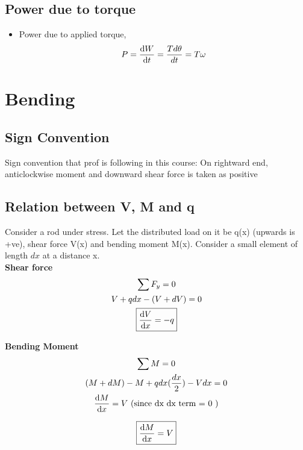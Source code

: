 \documentclass{article}
\begin{document}
	\subsection{Power due to torque}
	\begin{itemize}
		\item Power due to applied torque,
		\[P = \dv{W}{t} = \frac{Td\theta}{dt} = T\omega\]

	\end{itemize}


\section{Bending}

	\subsection{Sign Convention}
		Sign convention that prof is following in this course: On rightward end, anticlockwise moment and downward shear force is taken as positive


	\subsection{Relation between V, M and q}
		Consider a rod under stress. Let the distributed load on it be q(x) (upwards is +ve), shear force V(x) and bending moment M(x). Consider a small element of length $dx$ at a distance x. \\

		\noindent \textbf{Shear force}
		\begin{gather*}
			\sum F_y = 0\\
			V + q dx - (V+dV) =0 \\ %
			\boxed{\dv{V}{x} = - q}
		\end{gather*}

		\noindent \textbf{Bending Moment}
		\begin{gather*}
			\sum M = 0 \\
			(M + dM) - M + qdx (\frac{dx}{2}) - Vdx =0\\
			\dv{M}{x} = V \text{      (since dx dx term = 0 )}
		\end{gather*}

		\[\boxed{\dv{M}{x} = V}\]
\end{document}
